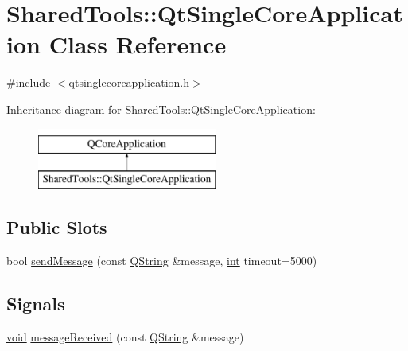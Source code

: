 \hypertarget{class_shared_tools_1_1_qt_single_core_application}{\section{Shared\-Tools\-:\-:Qt\-Single\-Core\-Application Class Reference}
\label{class_shared_tools_1_1_qt_single_core_application}
}


{\ttfamily \#include $<$qtsinglecoreapplication.\-h$>$}

Inheritance diagram for Shared\-Tools\-:\-:Qt\-Single\-Core\-Application\-:\begin{figure}[H]
\begin{center}
\leavevmode
\includegraphics[height=2.000000cm]{class_shared_tools_1_1_qt_single_core_application}
\end{center}
\end{figure}
\subsection*{Public Slots}
\begin{DoxyCompactItemize}
\item 
bool \hyperlink{class_shared_tools_1_1_qt_single_core_application_a448055bfbcd1182e23235f26fb11da3a}{send\-Message} (const \hyperlink{group___u_a_v_objects_plugin_gab9d252f49c333c94a72f97ce3105a32d}{Q\-String} \&message, \hyperlink{ioapi_8h_a787fa3cf048117ba7123753c1e74fcd6}{int} timeout=5000)
\end{DoxyCompactItemize}
\subsection*{Signals}
\begin{DoxyCompactItemize}
\item 
\hyperlink{group___u_a_v_objects_plugin_ga444cf2ff3f0ecbe028adce838d373f5c}{void} \hyperlink{class_shared_tools_1_1_qt_single_core_application_aa6a8b312d51ca8123e3a55261492f081}{message\-Received} (const \hyperlink{group___u_a_v_objects_plugin_gab9d252f49c333c94a72f97ce3105a32d}{Q\-String} \&message)
\end{DoxyCompactItemize}
